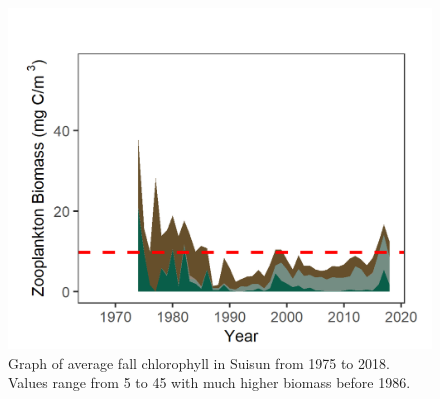 \documentclass[
]{book}
\begin{document}
\begin{panel-grid}
\begin{columns-nocenter}
\begin{column800}
\begin{expand}
\end{expand}

\end{column800}

\begin{column40}

~

\end{column40}

\begin{column800}

\begin{expand}

\begin{figure}
\includegraphics[width=15.25in]{figures/zoops_ssfall} \caption{Graph of average fall chlorophyll in Suisun from 1975 to 2018. Values range from 5 to 45 with much higher biomass before 1986.}\label{fig:unnamed-chunk-116}
\end{figure}

\end{expand}

\end{column800}

\begin{column40}

~

\end{column40}

\begin{column800}

\begin{expand}


\end{expand}
\end{column800}
\end{columns-nocenter}
\end{panel-grid}
\end{document}
